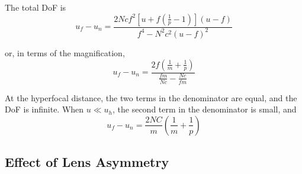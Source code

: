 \documentclass[11pt, oneside]{scrartcl}   	%
\begin{document}
The total DoF is
\begin{equation}
   u_f - u_n = \frac{2Ncf^2\left[u+f\left(\frac 1 p -1 \right)\right](u-f)}{f^4-N^2c^2(u-f)^2}
   \label{eq:totdof}
\end{equation}

or, in terms of the magnification,
\begin{equation}
   u_f - u_n = \frac{2f\left(\frac 1 m + \frac 1 p\right)}{\frac{fm}{Nc}-\frac{Nc}{fm}}
   \label{eq:magdof}
\end{equation}

At the hyperfocal distance, the two terms in the denominator are equal, and the DoF is
 infinite. When $u\ll u_h$, the second term in the denominator is small, and
\begin{equation}
   u_f - u_n = \frac{2NC}{m}\left(\frac 1 m + \frac 1 p\right)
   \label{eq:DOFapprox}
\end{equation}


\subsection{Effect of Lens Asymmetry}
\end{document}

